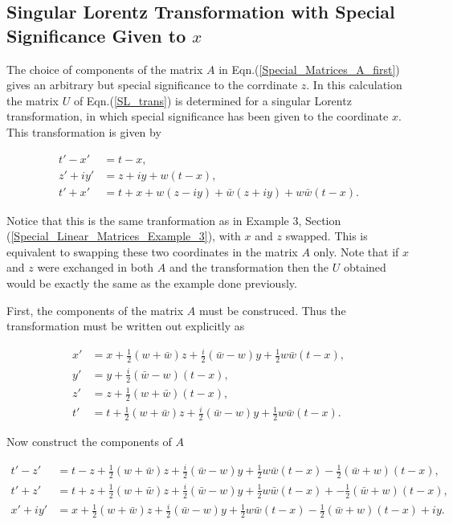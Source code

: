 \newpage

\begin{appendix}

\section{Singular Lorentz Transformation with Special Significance Given to $x$}\label{Appendix_Special_Significance_x}

The choice of components of the matrix $A$ in Eqn.(\ref{Special_Matrices_A_first}) gives an arbitrary but special significance to the corrdinate $z$. In this calculation the matrix $U$ of Eqn.(\ref{SL_trans}) is determined for a singular Lorentz transformation, in which special significance has been given to the coordinate $x$. This transformation is given by

\begin{align*}
t'-x' & = t-x, \\
z'+iy' & = z + iy + w(t-x), \\
t'+x' & = t+x + w(z-iy) + \bar{w} (z + iy) + w \bar{w} (t-x).
\end{align*}

\noindent Notice that this is the same tranformation as in Example 3, Section (\ref{Special_Linear_Matrices_Example_3}), with $x$ and $z$ swapped. This is equivalent to swapping these two coordinates in the matrix $A$ only. Note that if $x$ and $z$ were exchanged in both $A$ and the transformation then the $U$ obtained would be exactly the same as the example done previously.

First, the components of the matrix $A$ must be construced. Thus the transformation must be written out explicitly as 

\begin{align*}
x' & = x + \frac{1}{2} (w + \bar{w})z + \frac{i}{2}(\bar{w}- w)y + \frac{1}{2}w\bar{w}(t-x), \\
y' & = y + \frac{i}{2} (\bar{w} - w)(t-x), \\
z' & = z + \frac{1}{2} (w + \bar{w})(t-x), \\
t' & = t + \frac{1}{2} (w + \bar{w})z + \frac{i}{2} (\bar{w}-w)y + \frac{1}{2} w\bar{w}(t-x).
\end{align*}

\noindent Now construct the components of $A$

\begin{align*}
t' - z' & = t - z + \frac{1}{2}(w + \bar{w})z + \frac{i}{2} (\bar{w}-w)y + \frac{1}{2}w\bar{w}(t-x) - \frac{1}{2}(\bar{w} + w)(t-x),\\
t' + z' & = t + z + \frac{1}{2}(w + \bar{w})z + \frac{i}{2} (\bar{w}-w)y + \frac{1}{2}w\bar{w}(t-x) + -\frac{1}{2}(\bar{w} + w)(t-x),\\
x' + iy' & = x +  \frac{1}{2}(w + \bar{w})z + \frac{i}{2} (\bar{w}-w)y + \frac{1}{2}w\bar{w}(t-x) - \frac{1}{2}(\bar{w} + w)(t-x) + iy.
\end{align*}


\end{appendix}
